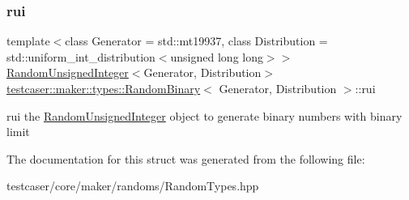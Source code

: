 \subsubsection{\texorpdfstring{rui}{rui}}
{\footnotesize\ttfamily template$<$class Generator = std\+::mt19937, class Distribution = std\+::uniform\+\_\+int\+\_\+distribution$<$unsigned long long$>$$>$ \\
\mbox{\hyperlink{classtestcaser_1_1maker_1_1types_1_1RandomUnsignedInteger}{Random\+Unsigned\+Integer}}$<$Generator, Distribution$>$ \mbox{\hyperlink{structtestcaser_1_1maker_1_1types_1_1RandomBinary}{testcaser\+::maker\+::types\+::\+Random\+Binary}}$<$ Generator, Distribution $>$\+::rui}



rui the \mbox{\hyperlink{classtestcaser_1_1maker_1_1types_1_1RandomUnsignedInteger}{Random\+Unsigned\+Integer}} object to generate binary numbers with binary limit 



The documentation for this struct was generated from the following file\+:\begin{DoxyCompactItemize}
\item 
testcaser/core/maker/randoms/Random\+Types.\+hpp\end{DoxyCompactItemize}

